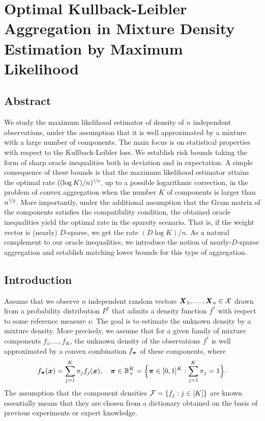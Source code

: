 
\chapter{Optimal Kullback-Leibler Aggregation in Mixture Density Estimation by Maximum Likelihood}



\section{Abstract}
	We study the maximum likelihood estimator of density of $n$ independent observations, 
	under the assumption that it is well approximated by a mixture with a large number of 
	components. The main focus is on statistical properties with respect to the 
	Kullback-Leibler loss. We establish risk bounds taking the form of sharp oracle inequalities
	both in deviation and in expectation. A simple consequence of these bounds is that the 
	maximum likelihood estimator attains the optimal rate $((\log K)/n)^{\nicefrac12}$, up to a 
	possible logarithmic correction, in the problem of convex aggregation when the number 
	$K$ of components is larger than $n^{\nicefrac12}$. More importantly, under the additional 
	assumption that the Gram matrix of the components satisfies the compatibility condition, 
	the obtained oracle inequalities yield the optimal rate in the sparsity scenario. That 
	is, if the weight vector is (nearly) $D$-sparse, we get the rate $(D\log K)/n$. As a
	natural complement to our oracle inequalities, we introduce the notion of nearly-$D$-sparse
	aggregation and establish matching lower bounds for this type of aggregation. 



\section{Introduction}
Assume that we observe $n$ independent random vectors $\boldsymbol X_1,\ldots,\boldsymbol X_n\in\mathcal X$ drawn from a probability distribution $P^*$
that admits a density function $f^*$ with respect to some reference measure $\nu$.
The goal is to estimate the unknown density by a mixture density. More precisely, we assume that for a given family of mixture
components $f_1,\ldots,f_K$, the unknown density of the observations $f^*$ is well approximated by a convex combination
$f_{\boldsymbol \pi}$ of these components, where
\begin{equation}
f_{\boldsymbol \pi}(\boldsymbol x)=\sum_{j=1}^K\pi_j f_j(\boldsymbol x), \quad \boldsymbol \pi \in {\mathbb B}_+^K=\Big\{\boldsymbol \pi\in [0,1]^K: \sum_{j=1}^K\pi_j=1\Big\}.
\end{equation}
The assumption that the component densities $\mathcal F=\{f_j:j\in[K]\}$ are known essentially means that they are chosen from a
dictionary obtained on the basis of previous experiments or expert knowledge.

